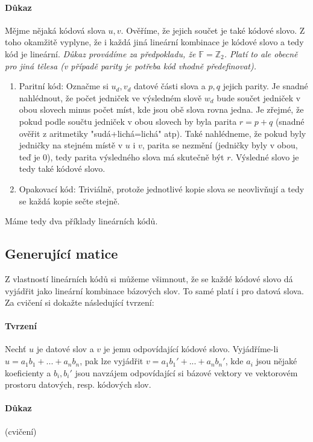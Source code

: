 \documentclass[a4paper,12pt]{article}
\newcommand{\F}{\mathbb{F}}
\newcommand{\Z}{\mathbb{Z}}
\begin{document}
\paragraph{Důkaz}
Mějme nějaká kódová slova $u, v$. Ověříme, že jejich součet je také kódové 
slovo. Z toho okamžitě vyplyne, že i každá jiná lineární kombinace je kódové 
slovo a tedy kód je lineární. \textit{Důkaz provádíme za předpokladu, že 
$\F=\Z_2$. Platí to ale obecně pro jiná tělesa (v případě parity je potřeba kód 
vhodně předefinovat).}
\begin{enumerate}
	\item Paritní kód: Označme si $u_d, v_d$ datové části slova a $p, q$ jejich 
	parity. Je snadné nahlédnout, že počet jedniček ve výsledném slově $w_d$ 
	bude součet jedniček v obou slovech minus počet míst, kde jsou obě slova 
	rovna jedna. Je zřejmé, že pokud podle součtu jedniček v obou slovech by 
	byla parita $r = p + q$ (snadné ověřit z aritmetiky "sudá+lichá=lichá" atp).  
	Také nahlédneme, že pokud byly jedničky na stejném místě v $u$ i $v$, parita 
	se nezmění (jedničky byly v obou, teď je 0), tedy parita výsledného slova má 
	skutečně být $r$.  Výsledné slovo je tedy také kódové slovo.
	\item Opakovací kód: Triviálně, protože jednotlivé kopie slova se 
	neovlivňují a tedy se každá kopie sečte stejně.
\end{enumerate}
Máme tedy dva příklady lineárních kódů.

\subsection{Generující matice}
Z vlastností lineárních kódů si můžeme všimnout, že se každé kódové slovo dá 
vyjádřit jako lineární kombinace bázových slov. To samé platí i pro datová 
slova. Za cvičení si dokažte následující tvrzení:

\paragraph{Tvrzení}
Nechť $u$ je datové slov a $v$ je jemu odpovídající kódové slovo. Vyjádříme-li 
$u=a_1b_1 + ... + a_nb_n$, pak lze vyjádřit $v=a_1b_1' + ... + a_nb_n'$, kde 
$a_i$ jsou nějaké koeficienty a $b_i, b_i'$ jsou navzájem odpovídající si bázové 
vektory ve vektorovém prostoru datových, resp. kódových slov.
\paragraph{Důkaz} (cvičení)
\vskip12pt
\end{document}
